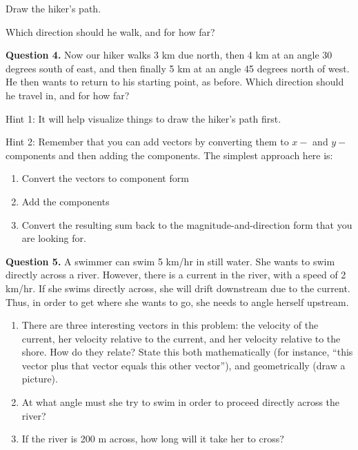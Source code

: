 \documentclass[12pt]{article}
\begin{document}
Draw the hiker's path. 








\vspace{3in}

Which direction should he walk, and for how far?










\newpage
{\bf Question 4.} Now our hiker walks 3 km due north, then 4 km at an angle 30 degrees south of east, and then finally 5 km at an angle 45 degrees north of west. He then wants to return to his starting point, as before. Which direction should he travel in, and for how far? 

Hint 1: It will help visualize things to draw the hiker's path first.

Hint 2: Remember that you can add vectors by converting them to $x-$ and $y-$components and then adding the components. The simplest approach here is:

\begin{enumerate}
	\item Convert the vectors to component form
	\item Add the components
	\item Convert the resulting sum back to the magnitude-and-direction form that you are looking for.
\end{enumerate}

\newpage
{\bf Question 5.} A swimmer can swim 5 km/hr in still water. She wants to swim directly across a river. However, there is a current in the river, with a speed of 2 km/hr. If she swims directly across, she will drift downstream due to the current. Thus, in order to get where she wants to go, she needs to angle herself upstream.

\begin{enumerate}
\item There are three interesting vectors in this problem: the velocity of the current, her velocity relative to the current, and her velocity relative to the shore. How do they relate? State this both mathematically (for instance, “this vector plus that vector equals this other vector”), and geometrically (draw a picture).
\vspace{3in}











\item At what angle must she try to swim in order to proceed directly across the river?





\vspace{1.5in}




\item If the river is 200 m across, how long will it take her to cross?

\end{enumerate}
\end{document}
